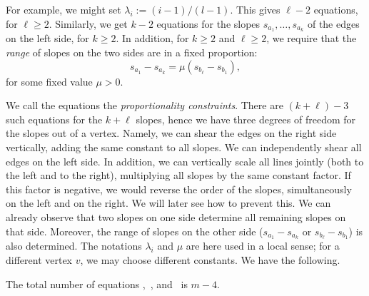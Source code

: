 For example, we might set $\lambda_i := (i-1)/(l-1)$.
This gives $\ell-2$ equations, for $\ell\ge 2$. Similarly, we get
$k-2$ equations for the slopes
$s_{a_1}, \dots, s_{a_{k}}$ of the edges on the left side, for $k\ge 2$.
In addition, for $k\ge 2$ and $\ell\ge 2$, we require that the \emph{range} of
slopes
on the two sides are in a fixed proportion:
\begin{equation}
\label{eq:proportion2}
s_{a_1}-s_{a_{k}} = \mu (s_{b_{\ell}}-s_{b_1}),
\end{equation}
for some fixed value $\mu>0$.

We call the equations
\thetag{\ref{eq:proportion}--\ref{eq:proportion2}} the
\emph{proportionality constraints}.
There are $(k+\ell)-3$ such equations for the $k+\ell$ slopes, hence we have three degrees of freedom for the slopes out of a vertex.
Namely, we can shear the edges on the right side vertically, adding the same constant to all
slopes. We can independently shear all edges on the left side.
In addition, we can vertically scale {all} lines jointly (both to
the left and to the right), multiplying all slopes by the same constant factor.
If this factor is negative, we would reverse the order of the
slopes, simultaneously on the left and on the right. We will later see how to prevent this. We can already observe that two slopes on one side determine all remaining slopes on that side. Moreover, the range of slopes on the other side ($s_{a_1}-s_{a_{k}}$ or $s_{b_{\ell}}-s_{b_1}$) is also determined.
%
The notations $\lambda_i$ and $\mu$ are here used in a local sense;
for a different vertex $v$, we may choose different constants.
We have the following.
\begin{lem} \label{le:number-of-equations}
The total number of equations \thetag{\ref{eq:slope0}},~\thetag{\ref{eq:proportion}}, and~\thetag{\ref{eq:proportion2}} is $m-4$.
\end{lem} 
